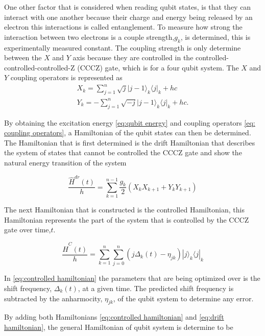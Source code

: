 One other factor that is considered when reading qubit states, is that they can interact with one another because their charge and energy being released by an electron this interactions is called entanglement. To measure how strong the interaction between two electrons is a couple strength,$g_k$, is determined, this is experimentally measured constant. The coupling strength is only determine between the $X$ and $Y$ axis because they are controlled in the controlled-controlled-controlled-Z
(CCCZ) gate, which is for a four qubit system. 
The $X$ and $Y$ coupling operators \cite{Ghosh2013} is represented as
\begin{gather}
    \label{eq: coupling operators}
  X_k = \sum^n_{j=1} \sqrt{j}\big| j-1 \big\rangle_k \big\langle j |_k + hc \\
Y_k = -\sum^n_{j=1} \sqrt{-j}\big| j-1 \big\rangle_k  \big\langle j |_k + hc.
\end{gather}

By obtaining the excitation energy \eqref{eq:qubit energy} and coupling operators \eqref{eq: coupling operators}, a Hamiltonian of the qubit states can then be determined. The Hamiltonian that is first determined is the drift Hamiltonian that describes the system of states that cannot be controlled the CCCZ gate and show the natural energy transition of the system

\begin{equation}
    \label{eq:drift hamiltonian}
  \frac{\hat{H}^{dr}(t)}{h} = \sum^{n-1}_{k=1} \frac{g_k}{2} (X_kX_{k+1}+Y_kY_{k+1})
 \end{equation}

The next Hamiltonian that is constructed is the controlled Hamiltonian, this Hamiltonian represents the part of the system that is controlled by the CCCZ gate over time,$t$. 
 
\begin{equation}
  \label{eq:controlled hamiltonian}
  \frac{\hat{H}^{C}(t)}{h} = \sum^n_{k=1} \sum^n_{j=0} (j\Delta_k(t)-\eta_{jk}) |j \big\rangle_k \big\langle j|_k
\end{equation}

In \eqref{eq:controlled hamiltonian} the parameters that are being optimized over is the shift frequency, $\Delta_k(t)$, at a given time. The predicted shift frequency is subtracted by the anharmocity, $\eta_{jk}$, of the qubit system to determine any error.  

By adding both Hamiltonians \eqref{eq:controlled hamiltonian} and \eqref{eq:drift hamiltonian}, the general Hamiltonian of qubit system \cite{Zahedinejad2015} is determine to be

